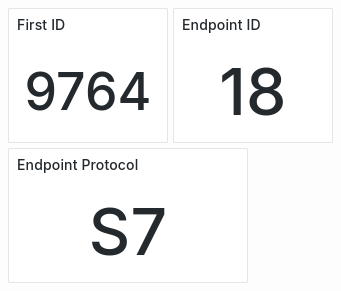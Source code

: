 \documentclass{article}
\begin{document}
\includegraphics[width=\textwidth]{panel_0009-0022.png}
\includegraphics[width=\textwidth]{panel_0012-0000.png}
\includegraphics[width=\textwidth]{panel_0012-0002.png}
\end{document}

